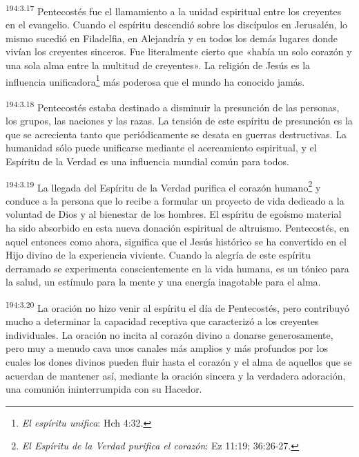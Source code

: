 \par 
\textsuperscript{194:3.17} Pentecostés fue el llamamiento a la unidad espiritual entre los creyentes en el evangelio. Cuando el espíritu descendió sobre los discípulos en Jerusalén, lo mismo sucedió en Filadelfia, en Alejandría y en todos los demás lugares donde vivían los creyentes sinceros. Fue literalmente cierto que «había un solo corazón y una sola alma entre la multitud de creyentes». La religión de Jesús es la influencia unificadora\footnote{\textit{El espíritu unifica}: Hch 4:32.} más poderosa que el mundo ha conocido jamás.

\par 
\textsuperscript{194:3.18} Pentecostés estaba destinado a disminuir la presunción de las personas, los grupos, las naciones y las razas. La tensión de este espíritu de presunción es la que se acrecienta tanto que periódicamente se desata en guerras destructivas. La humanidad sólo puede unificarse mediante el acercamiento espiritual, y el Espíritu de la Verdad es una influencia mundial común para todos.

\par 
\textsuperscript{194:3.19} La llegada del Espíritu de la Verdad purifica el corazón humano\footnote{\textit{El Espíritu de la Verdad purifica el corazón}: Ez 11:19; 36:26-27.} y conduce a la persona que lo recibe a formular un proyecto de vida dedicado a la voluntad de Dios y al bienestar de los hombres. El espíritu de egoísmo material ha sido absorbido en esta nueva donación espiritual de altruismo. Pentecostés, en aquel entonces como ahora, significa que el Jesús histórico se ha convertido en el Hijo divino de la experiencia viviente. Cuando la alegría de este espíritu derramado se experimenta conscientemente en la vida humana, es un tónico para la salud, un estímulo para la mente y una energía inagotable para el alma.

\par 
\textsuperscript{194:3.20} La oración no hizo venir al espíritu el día de Pentecostés, pero contribuyó mucho a determinar la capacidad receptiva que caracterizó a los creyentes individuales. La oración no incita al corazón divino a donarse generosamente, pero muy a menudo cava unos canales más amplios y más profundos por los cuales los dones divinos pueden fluir hasta el corazón y el alma de aquellos que se acuerdan de mantener así, mediante la oración sincera y la verdadera adoración, una comunión ininterrumpida con su Hacedor.

